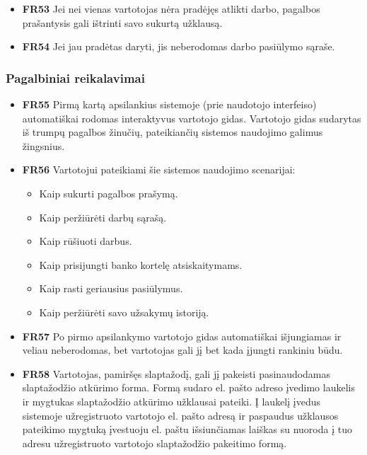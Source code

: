 \documentclass{VUMIFPSbakalaurinis}
\begin{document}
\begin{itemize}
	\item \textbf{FR53} Jei nei vienas vartotojas nėra pradėjęs atlikti darbo, pagalbos prašantysis gali ištrinti savo sukurtą užklausą.
	\item \textbf{FR54} Jei jau pradėtas daryti, jis neberodomas darbo pasiūlymo sąraše.
\end{itemize}

\subsubsection{Pagalbiniai reikalavimai}
\begin{itemize}
	\item \textbf{FR55} Pirmą kartą apsilankius sistemoje (prie naudotojo interfeiso) automatiškai rodomas interaktyvus vartotojo gidas. Vartotojo gidas sudarytas iš trumpų pagalbos žinučių, pateikiančių sistemos naudojimo galimus žingsnius. 
	\item \textbf{FR56} Vartotojui pateikiami šie sistemos naudojimo scenarijai:
	\begin{itemize}
		\item Kaip sukurti pagalbos prašymą.
		\item Kaip peržiūrėti darbų sąrašą.
		\item Kaip rūšiuoti darbus.
		\item Kaip prisijungti banko kortelę atsiskaitymams.
		\item Kaip rasti geriausius pasiūlymus.
		\item Kaip peržiūrėti savo užsakymų istoriją.
	\end{itemize}
	\item \textbf{FR57} Po pirmo apsilankymo vartotojo gidas automatiškai išjungiamas ir veliau neberodomas, bet vartotojas gali jį bet kada įjungti rankiniu būdu.
\end{itemize}

\begin{itemize}
	\item \textbf{FR58} Vartotojas, pamiršęs slaptažodį, gali jį pakeisti pasinaudodamas slaptažodžio atkūrimo forma. Formą sudaro el. pašto adreso įvedimo laukelis ir mygtukas slaptažodžio atkūrimo užklausai pateiki. Į laukelį įvedus sistemoje užregistruoto vartotojo el. pašto adresą ir paspaudus užklausos pateikimo mygtuką įvestuoju el. paštu išsiunčiamas laiškas su nuoroda į tuo adresu užregistruoto vartotojo slaptažodžio pakeitimo formą.
\end{itemize}
\end{document}
